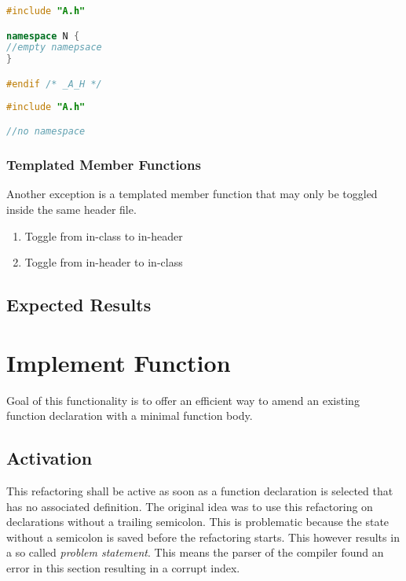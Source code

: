 \vspace{0.5cm}
\begin{minipage}{.48\textwidth}
\lstset{xrightmargin=0.5cm}
\begin{lstlisting}[caption={A.cpp, empty namespace},
label={delnamespace1}, language=C++]
#include "A.h"

namespace N {
//empty namepsace
}

#endif /* _A_H */
\end{lstlisting}
\end{minipage}%
\begin{minipage}{.48\textwidth}
\lstset{xleftmargin=0.5cm}
\begin{lstlisting}[caption={A.cpp, removed empty namepsace},
label={delnamespace2},language=C++]
#include "A.h"

//no namespace
\end{lstlisting}
\end{minipage}


\subsubsection{Templated Member Functions}

Another exception is a templated member function that may only be toggled
inside the same header file.
\begin{enumerate}
\item Toggle from in-class to in-header
\item Toggle from in-header to in-class
\end{enumerate}

\subsection{Expected Results}

\section{Implement Function}

Goal of this functionality is to offer an efficient way to amend an existing 
function declaration with a minimal function body.

\subsection{Activation}
This refactoring shall be active as soon as a function declaration is selected 
that has no associated definition. The original idea was to use this
refactoring on declarations without a trailing semicolon. This is problematic
because the state without a semicolon is saved before the refactoring starts.
This however results in a so called \textit{problem statement}. This means the
parser of the compiler found an error in this section resulting in a
corrupt index.\newline

